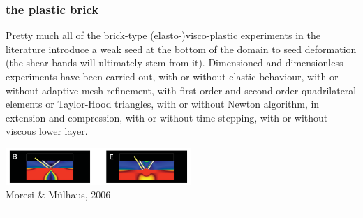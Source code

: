\subsubsection{the plastic brick} \label{ss:plasticbrick}

\Literature \cite{hans03,moml07,lemm08,kaus10,egat10,qurj09,mishin11,maie12,spmw16,gltf18,frbt19,aspectmanual}

Pretty much all of the brick-type (elasto-)visco-plastic experiments in the literature
introduce a weak seed at the bottom of the domain to seed deformation (the shear bands
will ultimately stem from it). 
Dimensioned and dimensionless experiments have been carried out, with or without 
elastic behaviour, with or without adaptive mesh refinement, with first order and 
second order quadrilateral elements or Taylor-Hood triangles, with or without 
Newton algorithm, in extension and compression, with or without time-stepping,
with or without viscous lower layer. 


\begin{center}
\includegraphics[width=7cm]{images/benchmark_brick/momu06}\\
{\captionfont Moresi \& M{\"u}lhaus, 2006 \cite{momu06}}
\end{center}

\begin{center}\noindent\rule{12cm}{0.4pt}\end{center}

